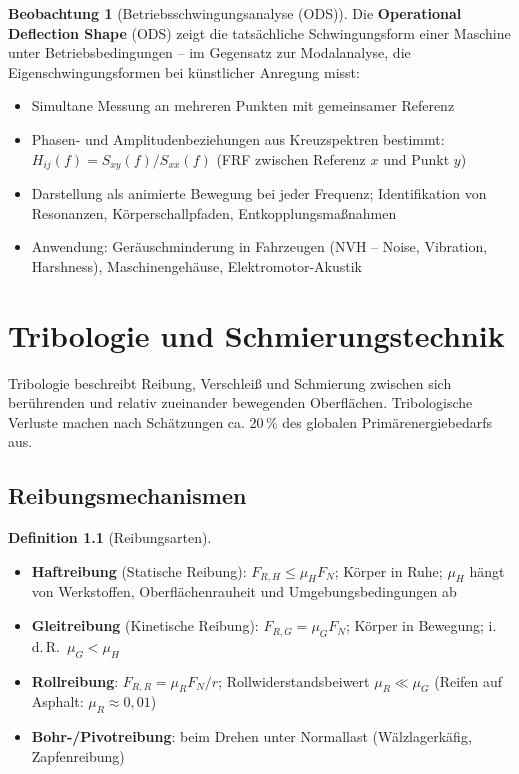 ﻿\documentclass[a4paper,12pt]{report}
\theoremstyle{definition}
\newtheorem{definition}{Definition}
\newtheorem{beobachtung}{Beobachtung}
\begin{document}
\begin{beobachtung}[Betriebsschwingungsanalyse (ODS)]
Die \textbf{Operational Deflection Shape} (ODS) zeigt die tatsächliche
Schwingungsform einer Maschine unter Betriebsbedingungen --
im Gegensatz zur Modalanalyse, die Eigenschwingungsformen bei
künstlicher Anregung misst:
\begin{itemize}
    \item[-] Simultane Messung an mehreren Punkten mit gemeinsamer Referenz
    \item[-] Phasen- und Amplitudenbeziehungen aus Kreuzspektren bestimmt:
          $H_{ij}(f) = S_{xy}(f)/S_{xx}(f)$ (FRF zwischen Referenz $x$ und Punkt $y$)
    \item[-] Darstellung als animierte Bewegung bei jeder Frequenz;
          Identifikation von Resonanzen, Körperschallpfaden, Entkopplungsmaßnahmen
    \item[-] Anwendung: Geräuschminderung in Fahrzeugen (NVH -- Noise, Vibration, Harshness),
          Maschinengehäuse, Elektromotor-Akustik
\end{itemize}
\end{beobachtung}

\chapter{Tribologie und Schmierungstechnik}

Tribologie beschreibt Reibung, Verschleiß und Schmierung zwischen
sich berührenden und relativ zueinander bewegenden Oberflächen.
Tribologische Verluste machen nach Schätzungen ca. 20\,\% des
globalen Primärenergiebedarfs aus.

\section{Reibungsmechanismen}

\begin{definition}[Reibungsarten]
\begin{itemize}
    \item[-] \textbf{Haftreibung} (Statische Reibung): $F_{R,H} \le \mu_H F_N$;
          K\"orper in Ruhe; $\mu_H$ hängt von Werkstoffen, Oberflächenrauheit
          und Umgebungsbedingungen ab
    \item[-] \textbf{Gleitreibung} (Kinetische Reibung): $F_{R,G} = \mu_G F_N$;
          K\"orper in Bewegung; i.\,d.\,R.\ $\mu_G < \mu_H$
    \item[-] \textbf{Rollreibung}: $F_{R,R} = \mu_R F_N / r$;
          Rollwiderstandsbeiwert $\mu_R \ll \mu_G$ (Reifen auf Asphalt: $\mu_R \approx 0{,}01$)
    \item[-] \textbf{Bohr-/Pivotreibung}: beim Drehen unter Normallast
          (Wälzlagerkäfig, Zapfenreibung)
\end{itemize}
\end{definition}
\end{document}

